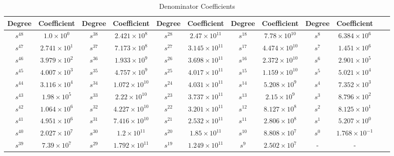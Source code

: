 \documentclass{article}
\begin{document}
\begin{table}[H]
  \centering
		\begin{adjustwidth}{-2.5cm}{}
		\caption{Denominator Coefficients}
		\begin{tabular}{|c|c|c|c|c|c|c|c|c|c|c|c|}
\hline
Degree & Coefficient & Degree & Coefficient & Degree & Coefficient & Degree & Coefficient & Degree & Coefficient\\
\hline
$s^{ 48 }$ & $ 1.0 \times 10^{ 0 }$ & $s^{ 38 }$ & $ 2.421 \times 10^{ 8 }$ & $s^{ 28 }$ & $ 2.47 \times 10^{ 11 }$  & $s^{ 18 }$ & $ 7.78 \times 10^{ 10 }$ & $s^{ 8 }$ & $ 6.384 \times 10^{ 6 }$ \\
\hline
$s^{ 47 }$ & $ 2.741 \times 10^{ 1 }$ & $s^{ 37 }$ & $ 7.173 \times 10^{ 8 }$ & $s^{ 27 }$ & $ 3.145 \times 10^{ 11 }$  & $s^{ 17 }$ & $ 4.474 \times 10^{ 10 }$ & $s^{ 7 }$ & $ 1.451 \times 10^{ 6 }$ \\
\hline
$s^{ 46 }$ & $ 3.979 \times 10^{ 2 }$ & $s^{ 36 }$ & $ 1.933 \times 10^{ 9 }$ & $s^{ 26 }$ & $ 3.698 \times 10^{ 11 }$  & $s^{ 16 }$ & $ 2.372 \times 10^{ 10 }$ & $s^{ 6 }$ & $ 2.901 \times 10^{ 5 }$ \\
\hline
$s^{ 45 }$ & $ 4.007 \times 10^{ 3 }$ & $s^{ 35 }$ & $ 4.757 \times 10^{ 9 }$ & $s^{ 25 }$ & $ 4.017 \times 10^{ 11 }$  & $s^{ 15 }$ & $ 1.159 \times 10^{ 10 }$ & $s^{ 5 }$ & $ 5.021 \times 10^{ 4 }$ \\
\hline
$s^{ 44 }$ & $ 3.116 \times 10^{ 4 }$ & $s^{ 34 }$ & $ 1.072 \times 10^{ 10 }$ & $s^{ 24 }$ & $ 4.031 \times 10^{ 11 }$  & $s^{ 14 }$ & $ 5.208 \times 10^{ 9 }$ & $s^{ 4 }$ & $ 7.352 \times 10^{ 3 }$ \\
\hline
$s^{ 43 }$ & $ 1.98 \times 10^{ 5 }$ & $s^{ 33 }$ & $ 2.22 \times 10^{ 10 }$ & $s^{ 23 }$ & $ 3.737 \times 10^{ 11 }$  & $s^{ 13 }$ & $ 2.15 \times 10^{ 9 }$ & $s^{ 3 }$ & $ 8.796 \times 10^{ 2 }$ \\
\hline
$s^{ 42 }$ & $ 1.064 \times 10^{ 6 }$ & $s^{ 32 }$ & $ 4.227 \times 10^{ 10 }$ & $s^{ 22 }$ & $ 3.201 \times 10^{ 11 }$  & $s^{ 12 }$ & $ 8.127 \times 10^{ 8 }$ & $s^{ 2 }$ & $ 8.125 \times 10^{ 1 }$ \\
\hline
$s^{ 41 }$ & $ 4.951 \times 10^{ 6 }$ & $s^{ 31 }$ & $ 7.416 \times 10^{ 10 }$ & $s^{ 21 }$ & $ 2.532 \times 10^{ 11 }$  & $s^{ 11 }$ & $ 2.806 \times 10^{ 8 }$ & $s^{ 1 }$ & $ 5.207 \times 10^{ 0 }$ \\
\hline
$s^{ 40 }$ & $ 2.027 \times 10^{ 7 }$ & $s^{ 30 }$ & $ 1.2 \times 10^{ 11 }$ & $s^{ 20 }$ & $ 1.85 \times 10^{ 11 }$  & $s^{ 10 }$ & $ 8.808 \times 10^{ 7 }$ & $s^{ 0 }$ & $ 1.768 \times 10^{ -1 }$ \\
\hline
$s^{ 39 }$ & $ 7.39 \times 10^{ 7 }$ & $s^{ 29 }$ & $ 1.792 \times 10^{ 11 }$ & $s^{ 19 }$ & $ 1.249 \times 10^{ 11 }$  & $s^{ 9 }$ & $ 2.502 \times 10^{ 7 }$ & - & - \\
\hline
  	\end{tabular}
	\end{adjustwidth}
\end{table}
\end{document}
